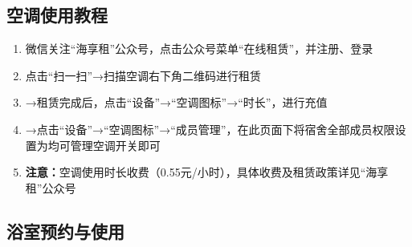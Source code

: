 \subsection[空调使用教程]{空调使用教程}
\label{air_control}
\begin{enumerate}
    \item 微信关注“海享租”公众号，点击公众号菜单“在线租赁”，并注册、登录
    \item 点击“扫一扫”→扫描空调右下角二维码进行租赁\footnotemark
    \item →租赁完成后，点击“设备”→“空调图标”→“时长”，进行充值
    \item →点击“设备”→“空调图标”→“成员管理”，在此页面下将宿舍全部成员权限设置为均可管理空调开关即可
    \item \textbf{注意：}空调使用时长收费（0.55元/小时），具体收费及租赁政策详见“海享租”公众号
\end{enumerate}

\subsection[浴室预约与使用]{浴室预约与使用}
